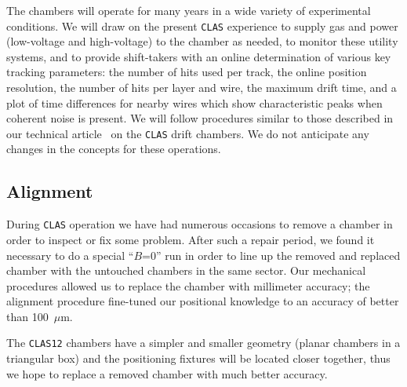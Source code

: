 \documentclass[12pt]{article}
\begin{document}
The chambers will operate for many years in a wide variety of experimental
conditions.  We will draw on the present {\tt CLAS} experience to supply gas and
power (low-voltage and high-voltage) to the chamber as needed, to monitor
these utility systems, and to provide shift-takers with an online determination
of various key tracking parameters: the number of hits used per track, the
online position resolution, the number of hits per layer and wire, the 
maximum drift time, and a plot of time differences for nearby wires which 
show characteristic peaks when coherent noise is present.  We will follow 
procedures similar to those described in our technical article~\cite{dcnim} 
on the {\tt CLAS} drift chambers.  We do not anticipate any changes in the
concepts for these operations.

\subsection{Alignment}

During {\tt CLAS} operation we have had numerous occasions to remove a chamber
in order to inspect or fix some problem.  After such a repair period, we
found it necessary to do a special ``$B$=0'' run in order to line up the 
removed and replaced chamber with the untouched chambers in the same sector.  
Our mechanical procedures allowed us to replace the chamber with millimeter 
accuracy; the alignment procedure fine-tuned our positional knowledge to an 
accuracy of better than 100~$\mu$m.

The {\tt CLAS12} chambers have a simpler and smaller geometry (planar chambers 
in a triangular box) and the positioning fixtures will be located closer 
together, thus we hope to replace a removed chamber with much better accuracy.



\vfil
\eject
\end{document}

